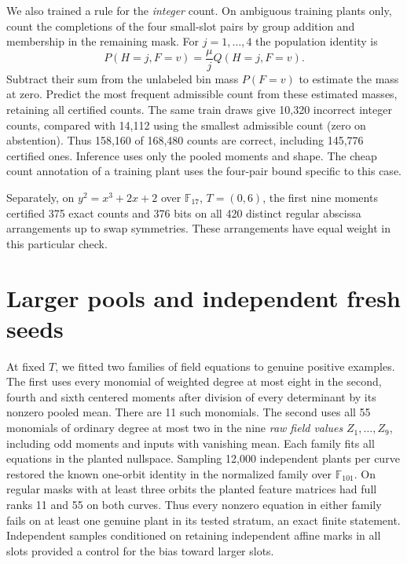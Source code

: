 \documentclass[11pt]{article}
\newcommand{\F}{\mathbb F}
\begin{document}
We also trained a rule for the \emph{integer} count. On ambiguous training
plants only, count the completions of the four small-slot pairs by group
addition and membership in the remaining mask. For $j=1,\ldots,4$ the
population identity is
\[
 P(H=j,F=v)=\frac{\mu}{j} Q(H=j,F=v).
\]
Subtract their sum from the unlabeled bin mass $P(F=v)$ to estimate the
mass at zero. Predict the most frequent admissible count from these
estimated masses, retaining all certified counts. The same train draws
give 10,320 incorrect integer counts, compared with 14,112 using the
smallest admissible count (zero on abstention). Thus 158,160 of 168,480
counts are correct, including 145,776 certified ones. Inference uses
only the pooled moments and shape. The cheap count annotation of a
training plant uses the four-pair bound specific to this case.

Separately, on $y^2=x^3+2x+2$ over $\F_{17}$, $T=(0,6)$, the first nine
moments certified 375 exact counts and 376 bits on all 420 distinct
regular abscissa arrangements up to swap symmetries. These arrangements
have equal weight in this particular check.

\section{Larger pools and independent fresh seeds}
At fixed $T$, we fitted two families of field equations to genuine
positive examples. The first uses every monomial of weighted degree at
most eight in the second, fourth and sixth centered moments after
division of every determinant by its nonzero pooled mean. There are
11 such monomials. The second uses all 55 monomials of ordinary degree
at most two in the nine \emph{raw field values} $Z_1,\ldots,Z_9$,
including odd moments and inputs with vanishing mean. Each family fits
all equations in the planted nullspace. Sampling 12,000 independent
plants per curve restored the known one-orbit identity in the normalized
family over $\F_{101}$. On regular masks with at least three orbits the
planted feature matrices had full ranks 11 and 55 on both curves. Thus
every nonzero equation in either family fails on at least one genuine
plant in its tested stratum, an exact finite statement. Independent
samples conditioned on retaining independent affine marks in all slots
provided a control for the bias toward larger slots.
\end{document}
